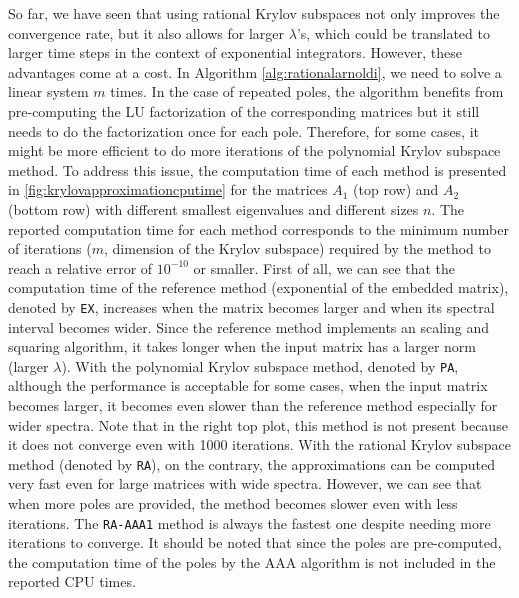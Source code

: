 So far, we have seen that using rational Krylov subspaces not only improves the convergence rate,
but it also allows for larger $\lambda$'s, which could be translated to larger time steps in
the context of exponential integrators.
However, these advantages come at a cost. In Algorithm \ref{alg:rationalarnoldi}, we need to
solve a linear system $m$ times. In the case of repeated poles, the algorithm benefits from pre-computing
the LU factorization of the corresponding matrices but it still needs to do the factorization
once for each pole. Therefore, for some cases, it might be more efficient to do more iterations
of the polynomial Krylov subspace method.
To address this issue, the computation time of each method is presented in
\autoref{fig:krylovapproximationcputime} for the matrices $A_1$ (top row) and $A_2$
(bottom row) with different smallest eigenvalues and different sizes $n$.
The reported computation time for each method corresponds to the minimum number of
iterations ($m$, dimension of the Krylov subspace) required by the method to reach
a relative error of $10^{-10}$ or smaller.
First of all, we can see that the computation time of the reference method (exponential of the
embedded matrix), denoted by \texttt{EX}, increases when the matrix becomes larger and when
its spectral interval becomes wider. Since the reference method implements an scaling and squaring
algorithm, it takes longer when the input matrix has a larger norm (larger $\lambda$).
With the polynomial Krylov subspace method, denoted by \texttt{PA}, although the performance
is acceptable for some cases, when the input matrix becomes larger, it becomes even slower than
the reference method especially for wider spectra. Note that in the right top plot,
this method is not present because it does not converge even with 1000 iterations.
With the rational Krylov subspace method (denoted by \texttt{RA}), on the contrary,
the approximations can be computed very fast even for large matrices with wide spectra.
However, we can see that when more poles are provided, the method becomes slower even
with less iterations. The \texttt{RA-AAA1} method is always the fastest one despite
needing more iterations to converge.
It should be noted that since the poles are pre-computed, the computation time of
the poles by the AAA algorithm is not included in the reported CPU times.

